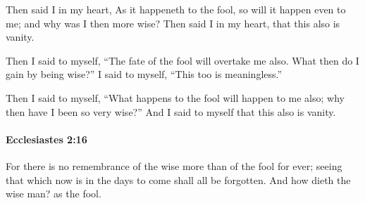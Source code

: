 			\begin{versebox}
					\item[BHS] 
					\item[LXX] 
					\item[ASV] Then said I in my heart, As it happeneth to the fool, so will it happen even to me; and why was I then more wise? Then said I in my heart, that this also is vanity.
					\item[NIV] Then I said to myself, “The fate of the fool will overtake me also. What then do I gain by being wise?” I said to myself, “This too is meaningless.”
					\item[NRSV] Then I said to myself, “What happens to the fool will happen to me also; why then have I been so very wise?” And I said to myself that this also is vanity.
			\end{versebox}

		\paragraph{Ecclesiastes 2:16} %
			\label{ECCLESIASTES-2-16}

			For there is no remembrance of the wise more than of the fool for ever; seeing that which now is in the days to come shall all be forgotten. And how dieth the wise man? as the fool.

